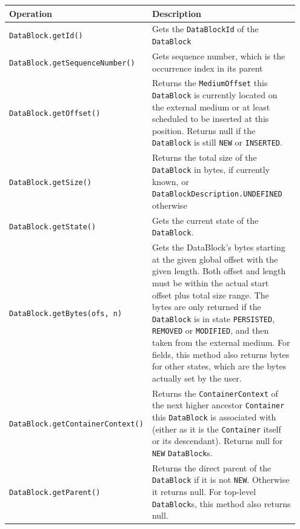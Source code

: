 \small
\begin{landscape}
\begin{longtable}{|p{0.3\linewidth}|p{0.65\linewidth}|}
\hline
\rowcolor[gray]{.9}\textbf{Operation} & \textbf{Description} \\
\endhead
\hline
\texttt{DataBlock}\linebreak\texttt{.getId()} & Gets the \texttt{DataBlockId} of the \texttt{DataBlock} \\
\hline
\texttt{DataBlock}\linebreak\texttt{.getSequenceNumber()} & Gets sequence number, which is the occurrence index in its parent \\
\hline
\texttt{DataBlock}\linebreak\texttt{.getOffset()} & Returns the \texttt{MediumOffset} this \texttt{DataBlock} is currently located on the external medium or at least scheduled to be inserted at this position. Returns null if the \texttt{DataBlock} is still \texttt{NEW} or \texttt{INSERTED}. \\
\hline
\texttt{DataBlock}\linebreak\texttt{.getSize()} & Returns the total size of the \texttt{DataBlock} in bytes, if currently known, or \texttt{DataBlockDescription.UNDEFINED} otherwise \\
\hline
\texttt{DataBlock}\linebreak\texttt{.getState()} & Gets the current state of the \texttt{DataBlock}. \\
\hline
\texttt{DataBlock}\linebreak\texttt{.getBytes(ofs, n)} & Gets the DataBlock's bytes starting at the given global offset with the given length. Both offset and length must be within the actual start offset plus total size range. The bytes are only returned if the \texttt{DataBlock} is in state \texttt{PERSISTED}, \texttt{REMOVED} or \texttt{MODIFIED}, and then taken from the external medium. For fields, this method also returns bytes for other states, which are the bytes actually set by the user. \\
\hline
\texttt{DataBlock}\linebreak\texttt{.getContainerContext()} & Returns the \texttt{ContainerContext} of the next higher ancestor \texttt{Container} this \texttt{DataBlock} is associated with (either as it is the \texttt{Container} itself or its descendant). Returns null for \texttt{NEW} \texttt{DataBlock}s. \\
\hline
\texttt{DataBlock}\linebreak\texttt{.getParent()} & Returns the direct parent of the \texttt{DataBlock} if it is not \texttt{NEW}. Otherwise it returns null. For top-level \texttt{DataBlock}s, this method also returns null. \\

\end{longtable}
\end{landscape}
